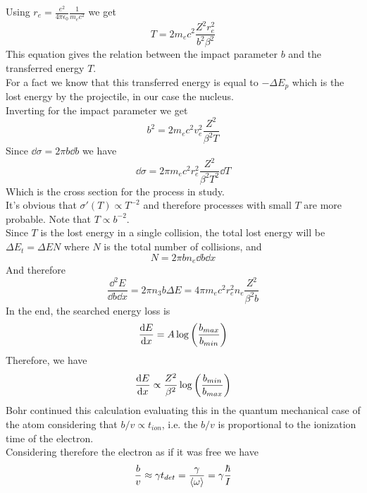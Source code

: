 \documentclass[../qm.tex]{subfiles}
\begin{document}
Using $r_e=\frac{e^2}{4\pi\epsilon_0}\frac{1}{m_ec^2}$ we get
\begin{equation}
	T=2m_ec^2\frac{Z^2r_e^2}{b^2\beta^2}
	\label{eq:energyvarelectron}
\end{equation}
This equation gives the relation between the impact parameter $b$ and the transferred energy $T$.\\
For a fact we know that this transferred energy is equal to $-\Delta E_p$ which is the lost energy by the projectile, in our case the nucleus.\\
Inverting for the impact parameter we get
\begin{equation}
	b^2=2m_ec^2v_e^2\frac{Z^2}{\beta^2T}
	\label{eq:impactparam}
\end{equation}
Since $\dd\sigma=2\pi b\dd b$ we have
\begin{equation}
	\dd\sigma=2\pi m_ec^2r_e^2\frac{Z^2}{\beta^2T^2}\dd T
	\label{eq:classicalemcs}
\end{equation}
Which is the cross section for the process in study.\\
It's obvious that $\sigma'(T)\propto T^{-2}$ and therefore processes with small $T$ are more probable. Note that $T\propto b^{-2}$.\\
Since $T$ is the lost energy in a single collision, the total lost energy will be $\Delta E_t=\Delta EN$ where $N$ is the total number of collisions, and
\begin{equation*}
	N=2\pi bn_e\dd b\dd x
\end{equation*}
And therefore
\begin{equation}
	\frac{\dd^2E}{\dd b\dd x}=2\pi n_3b\Delta E=4\pi m_ec^2r_e^2n_e\frac{Z^2}{\beta^2b}
	\label{eq:energylossddb}
\end{equation}
In the end, the searched energy loss is
\begin{equation*}
	\dv{E}{x}=A\log\left( \frac{b_{max}}{b_{min}} \right)
\end{equation*}
Therefore, we have
\begin{equation*}
	\dv{E}{x}\propto\frac{Z^2}{\beta^2}\log\left( \frac{b_{min}}{b_{max}} \right)
\end{equation*}
Bohr continued this calculation evaluating this in the quantum mechanical case of the atom considering that $b/v\propto t_{ion}$, i.e. the $b/v$ is proportional to the ionization time of the electron.\\
Considering therefore the electron as if it was free we have
\begin{equation*}
	\frac{b}{v}\approx\gamma t_{det}=\frac{\gamma}{\expval{\omega}}=\gamma\frac{\hbar}{I}
\end{equation*}
\end{document}
